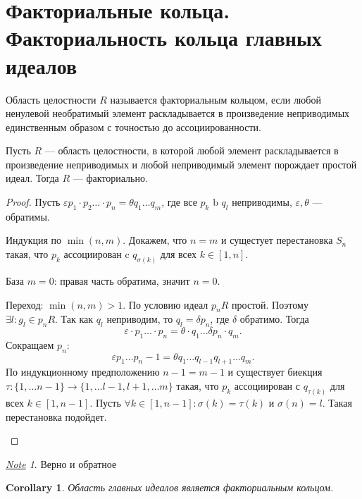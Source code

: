 \documentclass[11pt]{book}
\theoremstyle{definition}
\theoremstyle{plain}
\theoremstyle{plain}
\newtheorem{lm}{Lemma}
\newtheorem{cor}{Corollary}
\theoremstyle{definition}
\theoremstyle{remark}
\newtheorem*{note}{\underline{Note}}
\begin{document}
\section{Факториальные кольца. Факториальность кольца главных идеалов}
\begin{defn}
    Область целостности $ R$ называется {\sf факториальным кольцом}, если любой ненулевой  необратимый элемент  раскладывается в произведение неприводимых единственным образом с точностью до ассоциированности.
\end{defn}
%
\begin{thm}
    Пусть $ R$ --- область  целостности, в которой любой элемент раскладывается в произведение неприводимых и любой неприводимый элемент порождает простой идеал. Тогда $ R$ --- факториально.
\end{thm}
\begin{proof}
    Пусть $ \varepsilon  p_1 \cdot p_2 \ldots  \cdot p_n = \theta q_1 \ldots  q_m$, где все $ p_k$ b  $ q_l$ неприводимы,  $ \varepsilon, \theta $ --- обратимы.

    Индукция по $ \min(n, m)$. Докажем, что $ n = m$ и сущестует перестановка  $ S_n$ такая, что  $ p_k$ ассоциирован c  $ q_{\sigma(k)}$ для всех $ k \in [1, n]$.
\begin{description}
    \item 
    База $m=0$: правая часть обратима, значит $ n = 0$.
\item Переход: $ \min(n, m) > 1$.
    По условию идеал $ p_nR$ простой. Поэтому  $ \exists l: g_{l} \in p_nR$.
Так как $ q_l$ неприводим, то  $ q_l = \delta p_n$, где  $ \delta$ обратимо.
Тогда
 \[
\varepsilon \cdot p_1 \ldots \cdot p_n = \theta \cdot  q_1 \ldots  \delta p_n \cdot q_m
.\] 
Сокращаем $ p_n$:
 \[
\varepsilon p_1 \ldots p_n-1 = \theta q_1 \ldots q_{l-1} q_{l+1} \ldots q_m
.\] 
По индукционному предположению $ n - 1= m - 1$ и существует биекция  $ \tau: \{1, \ldots n-1\} \to  \{1, \ldots l-1, l+1, \ldots m\}$ такая, что $ p_k$ ассоциирован с $ q_{\tau(k)}$ для всех $ k \in [1, n-1]$. Пусть $ \forall k \in [1, n-1]: \sigma(k) = \tau(k)$  и $\sigma(n) = l$. Такая перестановка подойдет.
\end{description}
\end{proof}
\begin{note}
    Верно и обратное
\end{note}
\begin{cor}
    Область главных идеалов является факториальным кольцом.
\end{cor}
\end{document}
